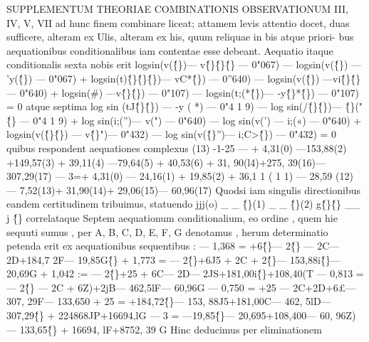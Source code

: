 \documentclass[12pt,a4paper]{article}
\begin{document}
 SUPPLEMENTUM THEORIAE COMBINATIONIS OBSERVATIONUM
III, IV, V, VII ad hunc finem combinare liceat; attamem levis attentio docet,
duas sufficere, alteram ex Ulis, alteram ex his, quum reliquae in bis atque priori-
bus aequationibus conditionalibus iam contentae esse debeant. Aequatio itaque
conditionalis sexta nobis erit
logsin(v(\^\{\})--- v\^\{\}\^\{\}\^\{\} --- 0"067) --- logsin(v(\^\{\}) --- 'y(\^\{\}) --- 0"067)
+ logsin(t)\^\{\}\^\{\}\^\{\})--- vC*\^\{\}) --- 0''640) --- logsin(v(\^\{\}) ---vi\^\{\}\^\{\} --- 0"640)
+ logsin(\#) ---v\^\{\}\^\{\}) --- 0"107) --- logsin(t;(*\^\{\})--- -y\^\{\}*\^\{\}) --- 0"107) = 0
atque septima
log sin (tJ\^\{\}\^\{\}) --- -y ( *) --- 0"4 1 9) --- log sin(/\^\{\}\^\{\})--- \^\{\}("\^\{\} --- 0"4 1 9)
+ log sin(i;('')--- v(") --- 0"640) --- log sin(v(') --- i;(«) --- 0"640)
+ logsin(v(\^\{\}\^\{\}) --- v\^\{\}")--- 0"432) --- log sin(v(\^\{\}'')--- i;C>\^\{\}) --- 0"432) = 0
quibus respondent aequationes complexus (13)
-1-25 --- + 4,31(0) ---153,88(2) +149,57(3) + 39,11(4) ---79,64(5)
+ 40,53(6) + 31, 90(l4)+275, 39(16)--- 307,29(17)
--- 3=+ 4,31(0) --- 24,16(1) + 19,85(2) + 36,1 1 ( 1 1) --- 28,59 (12)
--- 7,52(13)+ 31,90(14)+ 29,06(15)--- 60,96(17)
Quodsi iam singulis directionibus eandem certitudinem tribuimus, statuendo
jjj(o) \_ \_ \^\{\}(1) \_ \_ \^\{\}(2) g\^\{\}\^\{\} \_\_ j \^\{\} correlataque Septem aequationum conditionalium, eo
ordine , quem hie sequuti sumus , per A, B, C, D, E, F, G denotamus , herum
determinatio petenda erit ex aequationibus sequentibus :
--- 1,368 = +6\^\{\}--- 2\^\{\} --- 2C--- 2D+184,7 2F--- 19,85G\^\{\}
+ 1,773 = --- 2\^\{\}+6J5 + 2C + 2\^\{\}--- 153,88i\^\{\}--- 20,69G
+ 1,042 := --- 2\^\{\}+25 + 6C--- 2D--- 2JS+181,00i\^\{\}+108,40(T
--- 0,813 = --- 2\^\{\} --- 2C + 6Z)+2jB--- 462,5lF--- 60,96G
--- 0,750 = +25 --- 2C+2D+6£--- 307, 29F--- 133,650
+ 25 = +184,72\^\{\}--- 153, 88J5+181,00C--- 462, 5lD--- 307,29\^\{\}
+ 224868JP+16694,lG
--- 3 = ---19,85\^\{\}--- 20,695+108,400--- 60, 96Z)--- 133,65\^\{\}
+ 16694, lF+8752, 39 G
Hinc deducimus per eliminationem
\end{document}
